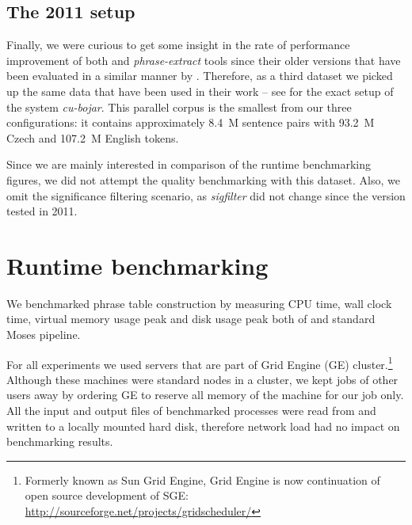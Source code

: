 \subsection{The 2011 setup}
Finally, we were curious to get some insight in the rate of performance improvement
of both \eppex{} and \emph{phrase-extract} tools since their older versions that have
been evaluated in a similar manner by \citet{przywara:eppex}.
Therefore, as a third dataset we picked up the same data that have been used in their
work -- see \citet{marecek:twostep} for the exact setup of the system \emph{cu-bojar}.
This parallel corpus is the smallest from our three configurations: it contains
approximately 8.4~M sentence pairs with 93.2~M Czech and 107.2~M English tokens.

Since we are mainly interested in comparison of the runtime benchmarking figures,
we did not attempt the quality benchmarking with this dataset.
Also, we omit the significance filtering scenario, as \emph{sigfilter} did not change
since the version tested in 2011.

\section{Runtime benchmarking}

We benchmarked phrase table construction by measuring CPU time, wall clock time,
virtual memory usage peak and disk usage peak both of \eppex{} and standard Moses
pipeline.

For all experiments we used servers that are part of Grid Engine (GE) cluster.\footnote{Formerly
known as Sun Grid Engine, Grid Engine is now continuation of open source development of SGE:
\url{http://sourceforge.net/projects/gridscheduler/}}
Although these machines were standard nodes in a cluster, we kept jobs of other
users away by ordering GE to reserve all memory of the machine for our job only.
All the input and output files of benchmarked processes were read from and written
to a locally mounted hard disk, therefore network load had no impact on
benchmarking results.

